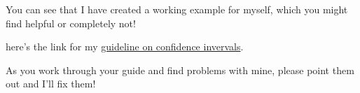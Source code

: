 \documentclass{tufte-handout}\usepackage[]{graphicx}\usepackage[]{color}
\begin{document}
You can see that I have created a working example for myself, which you might find helpful or completely not!

here's the link for my \href{https://github.com/marclos/beginnersluck/raw/master/Confidence_Intervals/Confidence_Intervals.pdf}{guideline on confidence invervals}. 

As you work through your guide and find problems with mine, please point them out and I'll fix them!

\FloatBarrier 
\begin{fullwidth}
%
%
\end{fullwidth}
\end{document}
